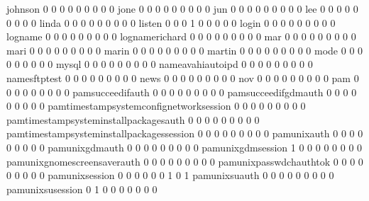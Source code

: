 \documentclass[compress,8pt]{beamer}
\begin{document}
\begin{frame}
\begin{Schunk}
  johnson                                    0   0   0   0   0   0   0   0   0
  jone                                       0   0   0   0   0   0   0   0   0
  jun                                        0   0   0   0   0   0   0   0   0
  lee                                        0   0   0   0   0   0   0   0   0
  linda                                      0   0   0   0   0   0   0   0   0
  listen                                     0   0   0   1   0   0   0   0   0
  login                                      0   0   0   0   0   0   0   0   0
  logname                                    0   0   0   0   0   0   0   0   0
  lognamerichard                             0   0   0   0   0   0   0   0   0
  mar                                        0   0   0   0   0   0   0   0   0
  mari                                       0   0   0   0   0   0   0   0   0
  marin                                      0   0   0   0   0   0   0   0   0
  martin                                     0   0   0   0   0   0   0   0   0
  mode                                       0   0   0   0   0   0   0   0   0
  mysql                                      0   0   0   0   0   0   0   0   0
  nameavahiautoipd                           0   0   0   0   0   0   0   0   0
  namesftptest                               0   0   0   0   0   0   0   0   0
  news                                       0   0   0   0   0   0   0   0   0
  nov                                        0   0   0   0   0   0   0   0   0
  pam                                        0   0   0   0   0   0   0   0   0
  pamsucceedifauth                           0   0   0   0   0   0   0   0   0
  pamsucceedifgdmauth                        0   0   0   0   0   0   0   0   0
  pamtimestampsystemconfignetworksession     0   0   0   0   0   0   0   0   0
  pamtimestampsysteminstallpackagesauth      0   0   0   0   0   0   0   0   0
  pamtimestampsysteminstallpackagessession   0   0   0   0   0   0   0   0   0
  pamunixauth                                0   0   0   0   0   0   0   0   0
  pamunixgdmauth                             0   0   0   0   0   0   0   0   0
  pamunixgdmsession                          1   0   0   0   0   0   0   0   0
  pamunixgnomescreensaverauth                0   0   0   0   0   0   0   0   0
  pamunixpasswdchauthtok                     0   0   0   0   0   0   0   0   0
  pamunixsession                             0   0   0   0   0   0   1   0   1
  pamunixsuauth                              0   0   0   0   0   0   0   0   0
  pamunixsusession                           0   1   0   0   0   0   0   0   0

\end{Schunk}
\end{frame}
\end{document}
